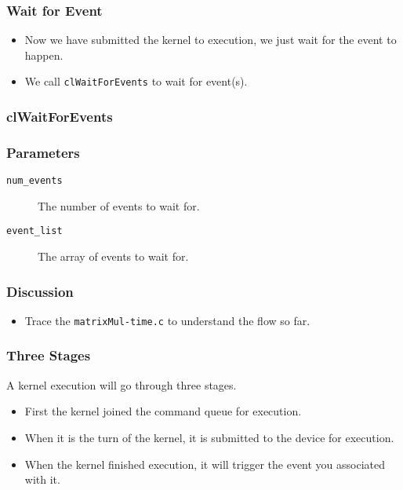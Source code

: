 \documentclass{beamer}
\begin{document}
\begin{frame}
\end{frame}

\begin{frame}
\end{frame}

\begin{frame}
  \frametitle{Wait for Event}
  \begin{itemize}
    \item Now we have submitted the kernel to execution, we just wait
      for the event to happen.
    \item We call {\tt clWaitForEvents} to wait for event(s).
  \end{itemize}
\end{frame}

\begin{frame}
  \frametitle{clWaitForEvents}
\end{frame}

\begin{frame}
  \frametitle{Parameters}
  \begin{description}
  \item [\tt num\_events] The number of events to wait for.
  \item [\tt event\_list] The array of events to wait for.
  \end{description}
\end{frame}

\begin{frame}
\end{frame}

\begin{frame}
  \frametitle{Discussion}
  \begin{itemize}
    \item Trace the {\tt matrixMul-time.c} to understand the flow so far.
  \end{itemize}
\end{frame}

\begin{frame}
  \frametitle{Three Stages}
  A kernel execution will go through three stages.
  \begin{itemize}
    \item First the kernel joined the command queue for execution.
    \item When it is the turn of the kernel, it is submitted to the
      device for execution.
    \item When the kernel finished execution, it will trigger the
      event you associated with it.
  \end{itemize}
\end{frame}
\end{document}
